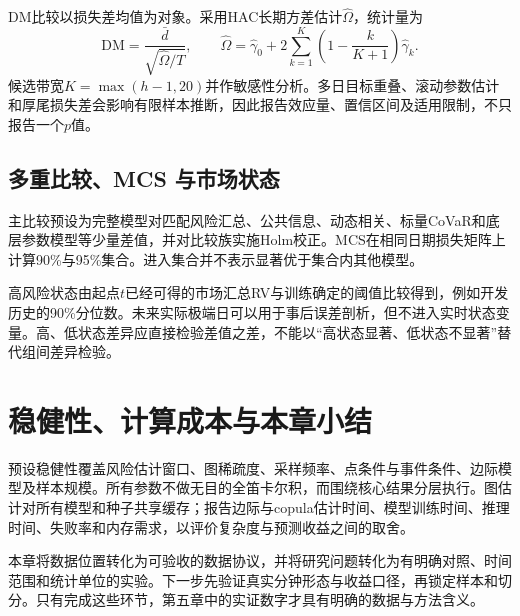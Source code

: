 DM比较以损失差均值为对象\cite{diebold1995}。采用HAC长期方差估计$\widehat\Omega$，统计量为
\begin{equation}\label{eq:dm}
\mathrm{DM}=\frac{\bar d}{\sqrt{\widehat\Omega/T}},\qquad
\widehat\Omega=\widehat\gamma_0+2\sum_{k=1}^{K}\left(1-\frac{k}{K+1}\right)\widehat\gamma_k.
\end{equation}
候选带宽$K=\max(h-1,20)$并作敏感性分析。多日目标重叠、滚动参数估计和厚尾损失差会影响有限样本推断，因此报告效应量、置信区间及适用限制，不只报告一个$p$值。

\subsection{多重比较、MCS 与市场状态}
主比较预设为完整模型对匹配风险汇总、公共信息、动态相关、标量CoVaR和底层参数模型等少量差值，并对比较族实施Holm校正。MCS在相同日期损失矩阵上计算90\%与95\%集合\cite{hansen2011}。进入集合并不表示显著优于集合内其他模型。

高风险状态由起点$t$已经可得的市场汇总RV与训练确定的阈值比较得到，例如开发历史的90\%分位数。未来实际极端日可以用于事后误差剖析，但不进入实时状态变量。高、低状态差异应直接检验差值之差，不能以“高状态显著、低状态不显著”替代组间差异检验。

\section{稳健性、计算成本与本章小结}
预设稳健性覆盖风险估计窗口、图稀疏度、采样频率、点条件与事件条件、边际模型及样本规模。所有参数不做无目的全笛卡尔积，而围绕核心结果分层执行。图估计对所有模型和种子共享缓存；报告边际与copula估计时间、模型训练时间、推理时间、失败率和内存需求，以评价复杂度与预测收益之间的取舍。

本章将数据位置转化为可验收的数据协议，并将研究问题转化为有明确对照、时间范围和统计单位的实验。下一步先验证真实分钟形态与收益口径，再锁定样本和切分。只有完成这些环节，第五章中的实证数字才具有明确的数据与方法含义。
